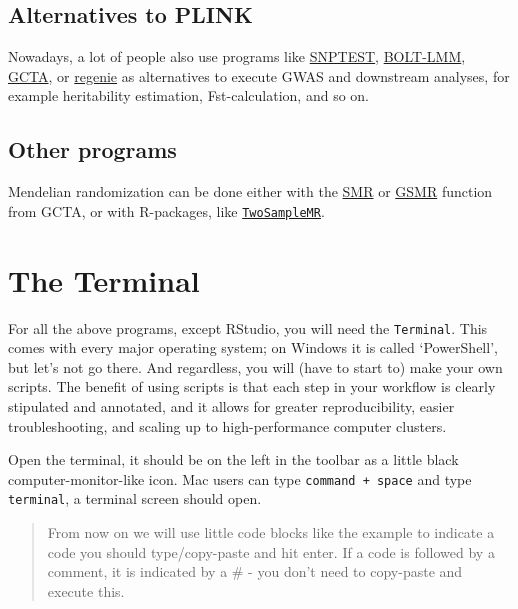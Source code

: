 \documentclass[
]{book}
\newcommand{\passthrough}[1]{#1}
\begin{document}
\hypertarget{alternatives-to-plink}{%
\subsection{Alternatives to PLINK}\label{alternatives-to-plink}}

Nowadays, a lot of people also use programs like \href{snptest}{SNPTEST}, \href{https://data.broadinstitute.org/alkesgroup/BOLT-LMM/}{BOLT-LMM}, \href{http://cnsgenomics.com/software/gcta/\#Overview}{GCTA}, or \href{https://rgcgithub.github.io/regenie/}{regenie} as alternatives to execute GWAS and downstream analyses, for example heritability estimation, Fst-calculation, and so on.

\hypertarget{other-programs}{%
\subsection{Other programs}\label{other-programs}}

Mendelian randomization can be done either with the \href{http://cnsgenomics.com/software/smr/\#Overview}{SMR} or \href{http://cnsgenomics.com/software/gsmr/}{GSMR} function from GCTA, or with R-packages, like \href{https://mrcieu.github.io/TwoSampleMR/}{\passthrough{\lstinline!TwoSampleMR!}}.

\hypertarget{the-terminal}{%
\section{The Terminal}\label{the-terminal}}

For all the above programs, except RStudio, you will need the \passthrough{\lstinline!Terminal!}. This comes with every major operating system; on Windows it is called `PowerShell', but let's not go there. And regardless, you will (have to start to) make your own scripts. The benefit of using scripts is that each step in your workflow is clearly stipulated and annotated, and it allows for greater reproducibility, easier troubleshooting, and scaling up to high-performance computer clusters.

Open the terminal, it should be on the left in the toolbar as a little black computer-monitor-like icon.
Mac users can type \passthrough{\lstinline!command + space!} and type \passthrough{\lstinline!terminal!}, a terminal screen should open.

\begin{quote}
From now on we will use little code blocks like the example to indicate a code you should type/copy-paste and hit enter. If a code is followed by a comment, it is indicated by a \# - you don't need to copy-paste and execute this.
\end{quote}
\end{document}
